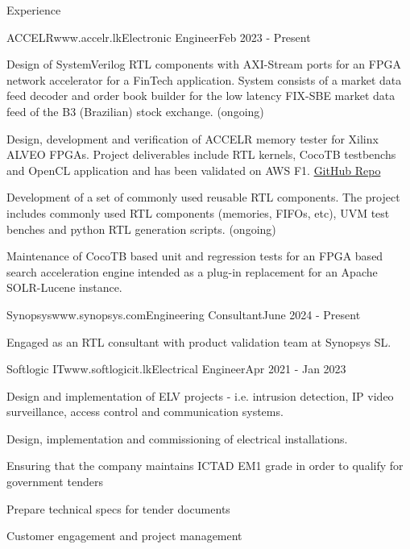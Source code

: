 \documentclass[
	11pt, %
]{./assets/resume} %
\begin{document}
\begin{rSection}{Experience}

	\begin{rSubsectionX}{ACCELR}{www.accelr.lk}{Electronic Engineer}{Feb 2023 - Present}
		\item Design of SystemVerilog RTL components with AXI-Stream ports for an FPGA network accelerator for a FinTech application. System consists of a market data feed decoder and order book builder for the low latency FIX-SBE market data feed of the B3 (Brazilian) stock exchange. (ongoing) 
		\item Design, development and verification of ACCELR memory tester for Xilinx ALVEO FPGAs. Project deliverables include RTL kernels, CocoTB testbenchs and OpenCL application and has been validated on AWS F1. \href{https://github.com/accelr-net/alveo-memory-tester}{GitHub Repo}
		\item Development of a set of commonly used reusable RTL components. The project includes commonly used RTL components (memories, FIFOs, etc), UVM test benches and python RTL generation scripts. (ongoing)
		\item Maintenance of CocoTB based unit and regression tests for an FPGA based search acceleration engine intended as a plug-in replacement for an Apache SOLR-Lucene instance.  
	\end{rSubsectionX}

	\begin{rSubsectionX}{Synopsys}{www.synopsys.com}{Engineering Consultant}{June 2024 - Present}
		\item Engaged as an RTL consultant with product validation team at Synopsys SL. 
	\end{rSubsectionX}

	\begin{rSubsectionX}{Softlogic IT}{www.softlogicit.lk}{Electrical Engineer}{Apr 2021 - Jan 2023}
		\item Design and implementation of ELV projects - i.e. intrusion detection, IP video surveillance, access control and communication systems.
		\item Design, implementation and commissioning of electrical installations. 
		\item Ensuring that the company maintains ICTAD EM1 grade in order to qualify for government tenders
		\item Prepare technical specs for tender documents
		\item Customer engagement and project management
	\end{rSubsectionX}


\end{rSection}
\end{document}
